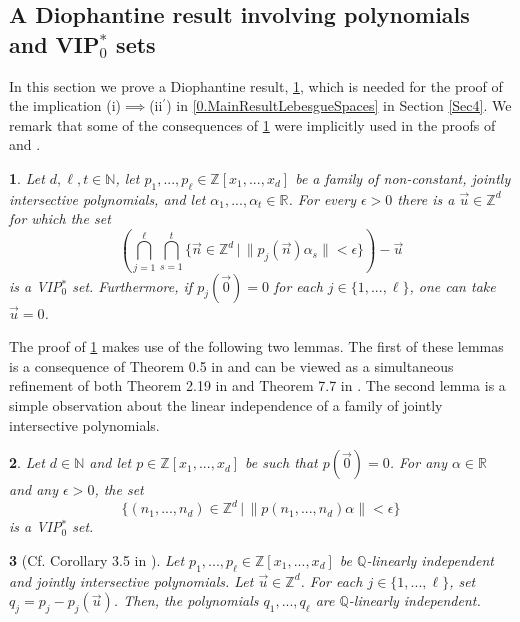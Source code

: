 \documentclass[11pt,american,preprint]{elsarticle}
\numberwithin{equation}{section}
\theoremstyle{plain}
\newtheorem{thm}{\protect\theoremname}[section]
\theoremstyle{plain*}
\theoremstyle{plain}
\newtheorem{lem}[thm]{\protect\lemmaname}
\theoremstyle{plain*}
\theoremstyle{plain}
\theoremstyle{plain*}
\theoremstyle{remark}
\theoremstyle{remark*}
\theoremstyle{remark}
\theoremstyle{remark*}
\theoremstyle{remark}
\theoremstyle{remark*}
\theoremstyle{plain}
\theoremstyle{definition}
\theoremstyle{plain}
\theoremstyle{plain} %
\providecommand{\lemmaname}{Lemma}
\providecommand{\theoremname}{Theorem}
\newcommand{\R}{\mathbb{R}}
\newcommand{\N}{\mathbb{N}}
\newcommand{\Q}{\mathbb{Q}}
\newcommand{\Z}{\mathbb{Z}}
\begin{document}
\subsection{A Diophantine result involving polynomials and VIP$_0^*$ sets}
In this section we prove a Diophantine result, \cref{3.thm:DiophantineRec}, which is needed for the proof of the implication (i)$\implies$(ii$^\prime$) in \cref{0.MainResultLebesgueSpaces} in Section \ref{Sec4}. We remark that  some of the consequences of \cref{3.thm:DiophantineRec} were implicitly used in the proofs of \cite[Theorem 1.4]{bergelson2008intersective} and \cite[Theorem 4.10]{AlmostIPBerLeib}. 
\begin{thm}\label{3.thm:DiophantineRec}
    Let $d,\ell,t\in\N$, let $p_1,...,p_\ell\in\Z[x_1,...,x_d]$ be a family of non-constant, jointly intersective polynomials, and let $\alpha_1,...,\alpha_t\in\R$. For every $\epsilon>0$ there is a ${\vec u}\in \Z^d$ for which the set  
    \begin{equation}\label{3.eq:DiophantineReturns}
\left(\bigcap_{j=1}^\ell\bigcap_{s=1}^t\{\vec n\in\Z^d\,|\,\|p_j(\vec n)\alpha_s\|<\epsilon\}\right)-{\vec u}
    \end{equation}
    is a {\rm VIP$_0^*$} set. Furthermore, if $p_j(\vec 0)=0$ for each $j\in\{1,...,\ell\}$, one can take ${\vec u}=0$. 
\end{thm}
The proof of \cref{3.thm:DiophantineRec} makes use of the following two lemmas. The first of these lemmas is a consequence of Theorem 0.5 in \cite{BerLeibNilsystemsIPr} and can be viewed as a simultaneous refinement of both Theorem 2.19 in \cite{Fbook} and Theorem 7.7 in \cite{BerUltraAcrossMath}. The second lemma is a simple observation about the linear independence of a family of jointly intersective polynomials.
\begin{lem}\label{3.lem:DiophantineRec}
    Let $d\in\N$ and let $p\in\Z[x_1,...,x_d]$ be such that $p(\vec 0)=0$. For any $\alpha\in\R$ and any $\epsilon>0$, the set 
    $$
\{(n_1,...,n_d)\in\Z^d\,|\,\|p(n_1,...,n_d)\alpha\|<\epsilon\}
    $$
    is a {\rm VIP$_0^*$} set. 
\end{lem}
\begin{lem}[Cf. Corollary 3.5 in \cite{bergelson2008intersective}] \label{3.lem:LinearIndForJointlyIntersective}
    Let $p_1,...,p_\ell\in\Z[x_1,...,x_d]$ be $\Q$-linearly independent and jointly intersective  polynomials.  Let ${\vec u}\in\Z^d$. For each $j\in\{1,...,\ell\}$, set $q_j=p_j-p_j({\vec u})$. Then, the polynomials $q_1,...,q_\ell$ are $\Q$-linearly independent. 
\end{lem}
\end{document}
